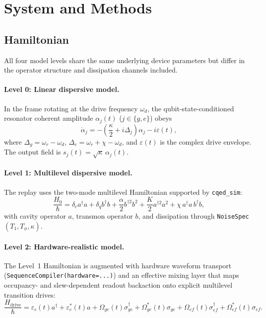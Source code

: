 \documentclass[aps,pra,twocolumn,reprint,amsmath,amssymb]{revtex4-2}
\begin{document}
\section{System and Methods}

\subsection{Hamiltonian}

All four model levels share the same underlying device parameters but differ in the operator structure and dissipation channels included.

\paragraph{Level 0: Linear dispersive model.}
In the frame rotating at the drive frequency $\omega_d$, the qubit-state-conditioned resonator coherent amplitude $\alpha_j(t)$ ($j\in\{g,e\}$) obeys
\begin{equation}
\dot{\alpha}_j = -\left(\frac{\kappa}{2} + i\Delta_j\right)\alpha_j - i\varepsilon(t),
\label{eq:linear_ode}
\end{equation}
where $\Delta_g = \omega_r - \omega_d$, $\Delta_e = \omega_r + \chi - \omega_d$, and $\varepsilon(t)$ is the complex drive envelope. The output field is $s_j(t) = \sqrt{\kappa}\,\alpha_j(t)$.

\paragraph{Level 1: Multilevel dispersive model.}
The replay uses the two-mode multilevel Hamiltonian supported by \texttt{cqed\_sim}:
\begin{equation}
\frac{H_0}{\hbar} = \delta_c a^\dagger a + \delta_q b^\dagger b + \frac{\alpha}{2}b^{\dagger 2}b^2 + \frac{K}{2}a^{\dagger 2}a^2 + \chi\,a^\dagger a\,b^\dagger b,
\label{eq:multilevel_H}
\end{equation}
with cavity operator $a$, transmon operator $b$, and dissipation through \texttt{NoiseSpec}$(T_1, T_\phi, \kappa)$.

\paragraph{Level 2: Hardware-realistic model.}
The Level~1 Hamiltonian is augmented with hardware waveform transport (\texttt{SequenceCompiler(hardware=...)}) and an effective mixing layer that maps occupancy- and slew-dependent readout backaction onto explicit multilevel transition drives:
\begin{equation}
\frac{H_\mathrm{drive}}{\hbar} = \varepsilon_c(t)a^\dagger + \varepsilon_c^*(t)a + \Omega_{ge}(t)\sigma_{ge}^\dagger + \Omega_{ge}^*(t)\sigma_{ge} + \Omega_{ef}(t)\sigma_{ef}^\dagger + \Omega_{ef}^*(t)\sigma_{ef}.
\end{equation}
\end{document}
